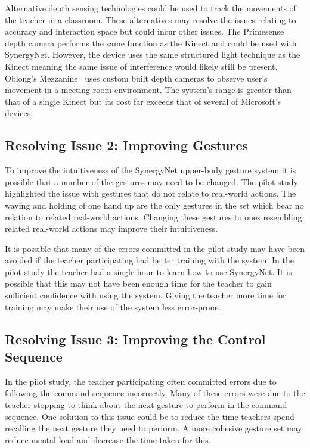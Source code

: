 \documentclass[link]{IWCOMP}
\begin{document}
Alternative depth sensing technologies could be used to track the movements of the teacher in a classroom.
These alternatives may resolve the issues relating to accuracy and interaction space but could incur other issues.
The Primesense~\cite{Wilson2010} depth camera performs the same function as the Kinect and could be used with SynergyNet.
However, the device uses the same structured light technique as the Kinect meaning the same issue of interference would likely still be present.
Oblong's Mezzanine~\cite{kramer2011} uses custom built depth cameras to observe user's movement in a meeting room environment.
The system's range is greater than that of a single Kinect but its cost far exceeds that of several of Microsoft's devices.

\subsection{Resolving Issue 2: Improving Gestures}
\label{subsec:resolvingIssuesObserved2}

To improve the intuitiveness of the SynergyNet upper-body gesture system it is possible that a number of the gestures may need to be changed.
The pilot study highlighted the issue with gestures that do not relate to real-world actions. 
The waving and holding of one hand up are the only gestures in the set which bear no relation to related real-world actions.
Changing these gestures to ones resembling related real-world actions may improve their intuitiveness.

It is possible that many of the errors committed in the pilot study may have been avoided if the teacher participating had better training with the system.
In the pilot study the teacher had a single hour to learn how to use SynergyNet.
It is possible that this may not have been enough time for the teacher to gain sufficient confidence with using the system.
Giving the teacher more time for training may make their use of the system less error-prone.

\subsection{Resolving Issue 3: Improving the Control Sequence}
\label{subsec:resolvingIssuesObserved3}

In the pilot study, the teacher participating often committed errors due to following the command sequence incorrectly.
Many of these errors were due to the teacher stopping to think about the next gesture to perform in the command sequence.
One solution to this issue could be to reduce the time teachers spend recalling the next gesture they need to perform.
A more cohesive gesture set may reduce mental load and decrease the time taken for this.
\end{document}
